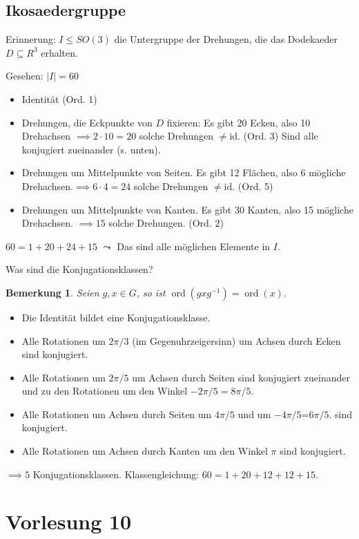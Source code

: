 \documentclass{article}
\theoremstyle{plain}
\newtheorem{bemerkung}{Bemerkung}
\newcommand{\ug}{\leq}
\newcommand{\ord}{\mathop{\text{ord}}}
\newcommand{\id}{\mathrm{id}}
\begin{document}
\subsection*{Ikosaedergruppe}
Erinnerung: $I\ug SO(3)$ die Untergruppe der Drehungen, die das Dodekaeder $D\subseteq R^3$ erhalten.

Gesehen: $|I|=60$
\begin{itemize}
    \item Identität (Ord. 1)
    \item Drehungen, die Eckpunkte von $D$ fixieren: Es gibt 20 Ecken, also 10 Drehachsen $\implies 2\cdot 10 = 20$ solche Drehungen $\neq \id$. (Ord. 3) Sind alle konjugiert zueinander (s. unten).
    \item Drehungen um Mittelpunkte von Seiten. Es gibt 12 Flächen, also 6 mögliche Drehachsen.$\implies 6{\cdot} 4 = 24$ solche Drehungen $\neq \id$. (Ord. 5)
    \item Drehungen um Mittelpunkte von Kanten. Es gibt 30 Kanten, also 15 mögliche Drehachsen. $\implies 15$ solche Drehungen. (Ord. 2)
\end{itemize}
$60=1+20+24+15$
$\leadsto$ Das sind alle möglichen Elemente in $I$.

Was sind die Konjugationsklassen?

\begin{bemerkung}
    Seien $g,x\in G$, so ist $\ord(gxg^{-1})=\ord(x)$.
\end{bemerkung}

\begin{itemize}
    \item Die Identität bildet eine Konjugationsklasse.
    \item Alle Rotationen um $2\pi/3$ (im Gegenuhrzeigersinn) um Achsen durch Ecken sind konjugiert.
    \item Alle Rotationen um $2\pi/5$ um Achsen durch Seiten sind konjugiert zueinander und zu den Rotationen um den Winkel $-2\pi/5 = 8\pi/5$.
    \item Alle Rotationen um Achsen durch Seiten um $4\pi/5$ und um $-4\pi/5$=$6\pi/5$. sind konjugiert.
    \item Alle Rotationen um Achsen durch Kanten um den Winkel $\pi$ sind konjugiert.
\end{itemize}
$\implies 5$ Konjugationsklassen.
Klassengleichung: $60=1+20+12+12+15$.

\section*{Vorlesung 10}
\end{document}
